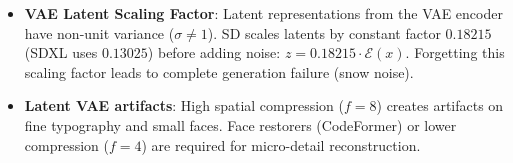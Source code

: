 \begin{trap}
\begin{itemize}
\item \textbf{VAE Latent Scaling Factor}: Latent representations from the VAE encoder have non-unit variance ($\sigma \ne 1$). SD scales latents by constant factor $0.18215$ (SDXL uses $0.13025$) before adding noise: $z = 0.18215 \cdot \mathcal{E}(x)$. Forgetting this scaling factor leads to complete generation failure (snow noise).
\item \textbf{Latent VAE artifacts}: High spatial compression ($f=8$) creates artifacts on fine typography and small faces. Face restorers (CodeFormer) or lower compression ($f=4$) are required for micro-detail reconstruction.
\end{itemize}
\end{trap}
